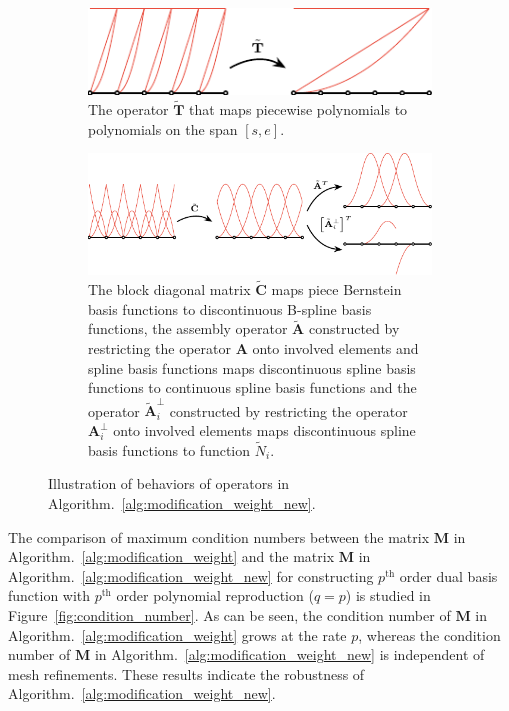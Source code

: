 \begin{figure}[ht]
	\begin{subfigure}{\linewidth}
		\center
		\includegraphics[scale=1.4]{algorithm_4_demo2}
		\caption{The operator $\tilde{\mathbf{T}}$ that maps piecewise polynomials to polynomials on the span $\left[s,e\right]$.}\label{fig:T-tilde}
	\end{subfigure}
	\begin{subfigure}{\linewidth}
		\center
		\includegraphics[scale=1.4]{algorithm_4_demo1}
		\caption{The block diagonal matrix $\tilde{\mathbf{C}}$ maps piece Bernstein basis functions to discontinuous B-spline basis functions, the assembly operator $\tilde{\mathbf{A}}$ constructed by restricting the operator $\mathbf{A}$ onto involved elements and spline basis functions maps discontinuous spline basis functions to continuous spline basis functions and the operator $\tilde{\mathbf{A}}^\perp_i$ constructed by restricting the operator $\mathbf{A}^\perp_i$ onto involved elements maps discontinuous spline basis functions to function $\tilde{N}_i$.}\label{fig:C_tilde_and_A_tilde}
	\end{subfigure}
	\caption{Illustration of behaviors of operators in Algorithm.~\ref{alg:modification_weight_new}. }
\end{figure}

The comparison of maximum condition numbers between the matrix $\mathbf{M}$ in Algorithm.~\ref{alg:modification_weight} and the matrix $\mathbf{M}$ in Algorithm.~\ref{alg:modification_weight_new} for constructing $p^\text{th}$ order dual basis function with $p^\text{th}$ order polynomial reproduction ($q=p$) is studied in Figure~\ref{fig:condition_number}. As can be seen, the condition number of $\mathbf{M}$ in Algorithm.~\ref{alg:modification_weight} grows at the rate $p$, whereas the condition number of $\mathbf{M}$ in Algorithm.~\ref{alg:modification_weight_new} is independent of mesh refinements. These results indicate the robustness of Algorithm.~\ref{alg:modification_weight_new}.

